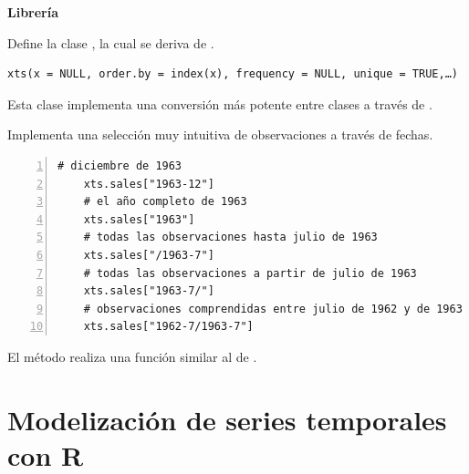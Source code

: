 \documentclass[10pt,a4paper,twoside]{beamer}
\begin{document}
\begin{frame}[fragile]
\textbf{Librería }

\begin{itemize*}
\item Define la clase , la cual se deriva de .
    \begin{Verbatim}[fontsize=\footnotesize]
    xts(x = NULL, order.by = index(x), frequency = NULL, unique = TRUE,…)
    \end{Verbatim}
\item Esta clase implementa una conversión más potente entre clases a través de .
\item Implementa una selección muy intuitiva de observaciones a través de fechas.
    \begin{Verbatim}[fontsize=\footnotesize, numbers = left]
    # diciembre de 1963
    xts.sales["1963-12"]
    # el año completo de 1963
    xts.sales["1963"]
    # todas las observaciones hasta julio de 1963
    xts.sales["/1963-7"]
    # todas las observaciones a partir de julio de 1963
    xts.sales["1963-7/"]
    # observaciones comprendidas entre julio de 1962 y de 1963
    xts.sales["1962-7/1963-7"]
    \end{Verbatim}
\item El método  realiza una función similar al  de .
\end{itemize*}

\end{frame}

\section{Modelización de series temporales con R}
\end{document}
